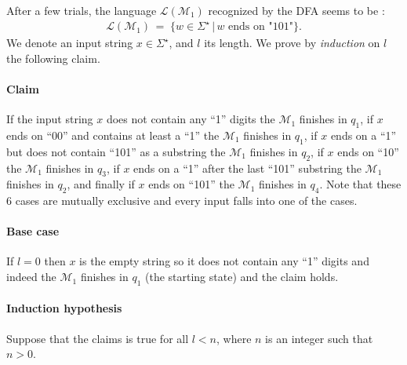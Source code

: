 \documentclass{article}
\begin{document}
\noindent After a few trials, the language $\mathcal{L}(\mathcal{M}_1)$ recognized by the DFA seems to be :
\begin{align*}
    \mathcal{L}(\mathcal{M}_1)\,=\;\{w\in\Sigma^\star\,|\, \text{$w$ ends on "101"}\}.
\end{align*}
We denote an input string $x\in\Sigma^\star$, and $l$ its length. We prove by \textit{induction} on $l$ the following claim.
\paragraph{Claim} If the input string $x$ does not contain any “1” digits the $\mathcal{M}_1$ finishes in $q_1$, if $x$ ends on “00” and contains at least a “1” the $\mathcal{M}_1$ finishes in $q_1$, if $x$ ends on a “1” but does not contain “101” as a substring the $\mathcal{M}_1$ finishes in $q_2$, if $x$ ends on “10” the $\mathcal{M}_1$ finishes in $q_3$, if $x$ ends on a “1” after the last “101” substring the $\mathcal{M}_1$ finishes in $q_2$, and finally if $x$ ends on “101” the $\mathcal{M}_1$ finishes in $q_4$. Note that these 6 cases are mutually exclusive and every input falls into one of the cases.
\paragraph{Base case} If $l=0$ then $x$ is the empty string so it does not contain any “1” digits and indeed the $\mathcal{M}_1$ finishes in $q_1$ (the starting state) and the claim holds.
\paragraph{Induction hypothesis} Suppose that the claims is true for all $l<n$, where $n$ is an integer such that $n>0$.
\end{document}
